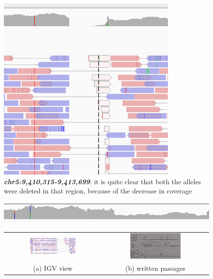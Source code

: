 \begin{figure}[H]
    \centering
    \includegraphics[width=0.8\textwidth]{pos2.PNG}
     \caption{\textbf{\textit{chr5:9,410,315-9,413,699}}: it is quite clear that
    both the alleles were deleted in that region, because of the decrease in
    coverage}
\end{figure}


\begin{figure}[t]
   \centering
   \includegraphics[width=1\textwidth]{cov3.PNG}
   \label{fig:cov3}
\end{figure}


\begin{figure}[H]
\begin{tabular}{cc}
  \includegraphics[width=0.5\textwidth]{pos3.PNG} &   \includegraphics[width=0.5\textwidth]{pos3passages.jpg} \\
(a) IGV view & (b) written passages \\[6pt]
\end{tabular}
\caption{}
\label{fig:ex_3}
\end{figure}



